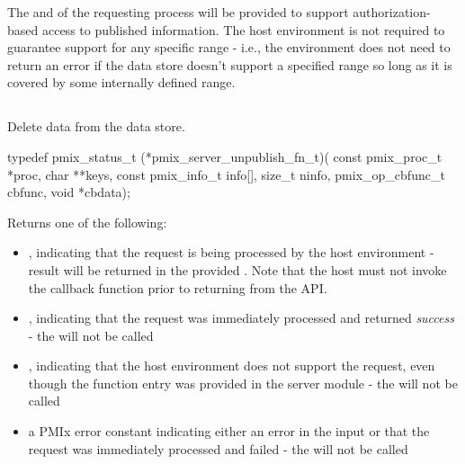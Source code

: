 \advicermstart
The  and  of the requesting process will be provided to support authorization-based access to published information. The host environment is not required to guarantee support for any specific range - i.e., the environment does not need to return an error if the data store doesn't support a specified range so long as it is covered by some internally defined range.
\advicermend

\subsection{}

\summary

Delete data from the data store.

\format

\cspecificstart
\begin{codepar}
typedef pmix_status_t (*pmix_server_unpublish_fn_t)(
                             const pmix_proc_t *proc,
                             char **keys,
                             const pmix_info_t info[],
                             size_t ninfo,
                             pmix_op_cbfunc_t cbfunc,
                             void *cbdata);
\end{codepar}
\cspecificend

\begin{arglist}
\end{arglist}

Returns one of the following:

\begin{itemize}
    \item {}, indicating that the request is being processed by the host environment - result will be returned in the provided . Note that the host must not invoke the callback function prior to returning from the \ac{API}.
    \item {}, indicating that the request was immediately processed and returned \textit{success} - the  will not be called
    \item {}, indicating that the host environment does not support the request, even though the function entry was provided in the server module - the  will not be called
    \item a PMIx error constant indicating either an error in the input or that the request was immediately processed and failed - the  will not be called
\end{itemize}


